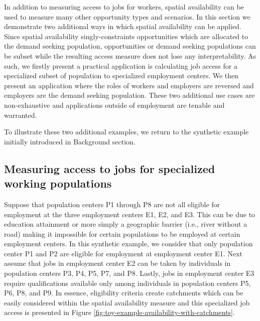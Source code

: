 \documentclass[]{elsarticle} %
\begin{document}
In addition to measuring access to jobs for workers, spatial
availability can be used to measure many other opportunity types and
scenarios. In this section we demonstrate two additional ways in which
spatial availability can be applied. Since spatial availability
singly-constraints opportunities which are allocated to the demand
seeking population, opportunities or demand seeking populations can be
subset while the resulting access measure does not lose any
interpretability. As such, we firstly present a practical application is
calculating job access for a specialized subset of population to
specialized employment centers. We then present an application where the
roles of workers and employers are reversed and employers are the demand
seeking population. These two additional use cases are non-exhaustive
and applications outside of employment are tenable and warranted.

To illustrate these two additional examples, we return to the synthetic
example initially introduced in Background section.

\hypertarget{measuring-access-to-jobs-for-specialized-working-populations}{%
\subsection{Measuring access to jobs for specialized working
populations}\label{measuring-access-to-jobs-for-specialized-working-populations}}

Suppose that population centers P1 through P8 are not all eligible for
employment at the three employment centers E1, E2, and E3. This can be
due to education attainment or more simply a geographic barrier (i.e.,
river without a road) making it impossible for certain populations to be
employed at certain employment centers. In this synthetic example, we
consider that only population center P1 and P2 are eligible for
employment at employment center E1. Next assume that jobs in employment
center E2 can be taken by individuals in population centers P3, P4, P5,
P7, and P8. Lastly, jobs in employment center E3 require qualifications
available only among individuals in population centers P5, P6, P8, and
P9. In essence, eligibility criteria create catchments which can be
easily considered within the spatial availability measure and this
specialized job access is presented in Figure
\ref{fig:toy-example-availability-with-catchments}.
\end{document}

